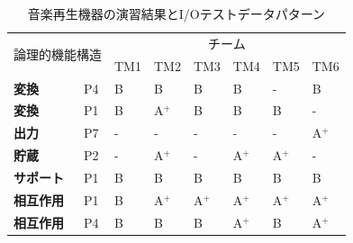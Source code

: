 \begin{table}[htbp]
  \centering
\caption{音楽再生機器の演習結果とI/Oテストデータパターン}
    \begin{tabular}{|l|l|l|l|l|l|l|l|}
    \hline
    \multicolumn{2}{|c|}{\multirow{2}[4]{*}{論理的機能構造}} & \multicolumn{6}{c|}{チーム} \bigstrut\\
\cline{3-8}    \multicolumn{2}{|c|}{} & TM1   & TM2   & TM3   & TM4   & TM5   & TM6 \bigstrut\\
    \hline
    \textbf{変換} & P4    & B     & B     & B     & B     & -     & B \bigstrut\\
    \hline
    \textbf{変換} & P1    & B     & A${}^\text{+}$    & B     & B     & B     & - \bigstrut\\
    \hline
    \textbf{出力} & P7    & -     & -     & -     & -     & -     & A${}^\text{+}$ \bigstrut\\
    \hline
    \textbf{貯蔵} & P2    & -     & A${}^\text{+}$    & -     & A${}^\text{+}$    & A${}^\text{+}$    & - \bigstrut\\
    \hline
    \textbf{サポート} & P1    & B     & B     & B     & B     & B     & B \bigstrut\\
    \hline
    \textbf{相互作用} & P1    & B     & A${}^\text{+}$    & A${}^\text{+}$    & A${}^\text{+}$    & A${}^\text{+}$    & A${}^\text{+}$ \bigstrut\\
    \hline
    \textbf{相互作用} & P4    & B     & B     & B     & A${}^\text{+}$    & B     & A${}^\text{+}$ \bigstrut\\
    \hline
    \end{tabular}%
\label{tbl:D-4-tbl7}%
\end{table}%

